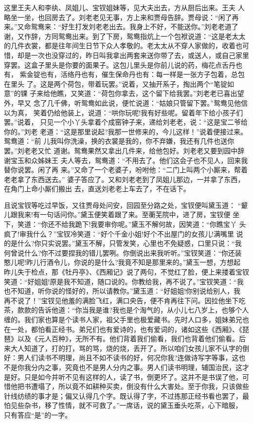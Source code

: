 这里王夫人和李纨、凤姐儿、宝钗姐妹等，见大夫出去，方从厨后出来。王夫
人略坐一坐，也回房去了。刘老老见无事，方上来和贾母告辞。贾母说：“闲了再
来。”又命鸳鸯来：“好生打发刘老老出去。我身上不好，不能送你。”刘老老道了
谢，又作辞，方同鸳鸯出来。到了下房，鸳鸯指炕上一个包袱说道：“这是老太太
的几件衣裳，都是往年间生日节下众人孝敬的。老太太从不穿人家做的，收着也可
惜，却是一次也没穿过的，昨日叫我拿出两套来送你带了去，或送人，或自己家里
穿罢。这盒子里头是你要的面果子。这包儿里头是你前儿说的药，梅花点舌丹也有，
紫金锭也有，活络丹也有，催生保命丹也有：每一样是一张方子包着，总包在里头
了。这是两个荷包，带着玩罢。”说着，又抽开系子，掏出两个“笔锭如意”的锞
子来给他瞧，又笑道：“荷包你拿去，这个留下给我罢。”刘老老已喜出望外，早又
念了几千佛，听鸳鸯如此说，便忙说道：“姑娘只管留下罢。”鸳鸯见他信以为真，
笑着仍给他装上，说道：“哄你玩呢!我有好些呢。留着年下给小孩子们罢。”说着，
只见一个小丫头拿着个成窑钟子来，递给刘老老，说：“这是宝二爷给你的。”刘老
老道：“这是那里说起?我那一世修来的，今儿这样！”说着便接过来。鸳鸯道：“前
儿我叫你洗澡，换的衣裳是我的，你不弃嫌，我还有几件也送你罢。”刘老老又忙
道谢。鸳鸯果然又拿出几件来，给他包好。刘老老又要到园中辞谢宝玉和众姊妹王
夫人等去，鸳鸯道：“不用去了。他们这会子也不见人，回来我替你说罢。闲了再
来。”又命了一个老婆子，吩咐他：“二门上叫两个小厮来，帮着老老拿了东西送去。”
婆子答应了。又和刘老老到了凤姐儿那边，一并拿了东西，在角门上命小厮们搬出
去，直送刘老老上车去了，不在话下。

且说宝钗等吃过早饭，又往贾母处问安，回园至分路之处，宝钗便叫黛玉道：
“颦儿跟我来!有一句话问你。”黛玉便笑着跟了来。至蘅芜院中，进了房，宝钗便
坐下，笑道：“你还不给我跪下!我要审你呢。”黛玉不解何故，因笑道：“你瞧宝丫
头疯了!审我什么？”宝钗冷笑道：“好个千金小姐!好个不出屋门的女孩儿!满嘴里
说的是什么?你只实说罢。”黛玉不解，只管发笑，心里也不免疑惑，口里只说：“我
何曾说什么?你不过要捏我的错儿罢咧。你倒说出来我听听。”宝钗笑道：“你还装
憨儿呢!昨儿行酒令儿，你说的是什么?我竟不知是那里来的。”黛玉一想，方想起
昨儿失于检点，那《牡丹亭》、《西厢记》说了两句，不觉红了脸，便上来搂着宝钗
笑道：“好姐姐!原是我不知道，随口说的。你教给我，再不说了。”宝钗笑道：“我
也不知道，听你说的怪好的，所以请教你。”黛玉道：“好姐姐!你别说给别人，我
再不说了！”宝钗见他羞的满脸飞红，满口央告，便不肯再往下问。因拉他坐下吃
茶，款款的告诉他道：“你当我是谁?我也是个淘气的，从小儿七八岁上，也够个人
缠的。我们家也算是个读书人家，祖父手里也极爱藏书。先时人口多，姐妹弟兄也
在一处，都怕看正经书。弟兄们也有爱诗的，也有爱词的，诸如这些《西厢》、《琵
琶》以及《元人百种》，无所不有。他们背着我们偷看，我们也背着他们偷看。后
来大人知道了，打的打，骂的骂，烧的烧，丢开了。所以咱们女孩儿家不认字的倒
好：男人们读书不明理，尚且不如不读书的好，何况你我?连做诗写字等事，这也
不是你我分内之事，究竟也不是男人分内之事。男人们读书明理，辅国治民，这才
是好。只是如今并听不见有这样的人，读了书，倒更坏了。这并不是书误了他，可
惜他把书遭塌了，所以竟不如耕种买卖，倒没有什么大害处。至于你我，只该做些
针线纺绩的事才是；偏又认得几个字。既认得了字，不过拣那正经书看也罢了，最
怕见些杂书，移了性情，就不可救了。”一席话，说的黛玉垂头吃茶，心下暗服，
只有答应“是”的一字。

